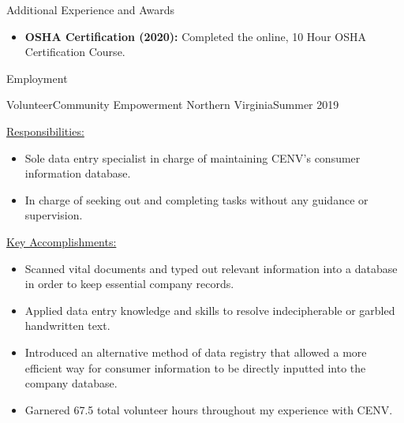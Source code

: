 \documentclass[]{cv}
\begin{document}
	\begin{cvsection}{Additional Experience and Awards}
		\begin{cvsubsection}{}{}{}	
			\begin{itemize}
				\item \textbf{OSHA Certification (2020):} Completed the online, 10 Hour OSHA Certification Course.
			\end{itemize}
		\end{cvsubsection}
	\end{cvsection}

	\begin{cvsection}{Employment}
		\begin{cvsubsection}{Volunteer}{Community Empowerment Northern Virginia}{Summer 2019}
			\begin{cvsubsection}{\underline{Responsibilities:}}{}{}
			\begin{itemize}
				\item Sole data entry specialist in charge of maintaining CENV’s consumer information database.
				\item In charge of seeking out and completing tasks without any guidance or supervision.
			\end{itemize}
			\end{cvsubsection}
			\begin{cvsubsection}{\underline{Key Accomplishments:}}{}{}
			\begin{itemize}
				\item Scanned vital documents and typed out relevant information into a database in order to keep essential company records.
				\item Applied data entry knowledge and skills to resolve indecipherable or garbled handwritten text.
				\item Introduced an alternative method of data registry that allowed a more efficient way for consumer information to be directly inputted into the company database.
				\item Garnered 67.5 total volunteer hours throughout my experience with CENV.
			\end{itemize}
			\end{cvsubsection}
		\end{cvsubsection}
		

\end{cvsection}
\end{document}
